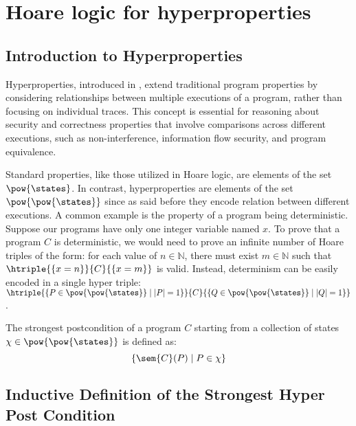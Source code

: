 \section{Hoare logic for hyperproperties}

\subsection{Introduction to Hyperproperties}
\label{chp:hyper}

Hyperproperties, introduced in \cite{Clarkson08}, extend traditional program 
properties by considering relationships between multiple executions of a 
program, rather than focusing on individual traces. This concept is essential 
for reasoning about security and correctness properties that involve comparisons 
across different executions, such as non-interference, information flow security, 
and program equivalence.

Standard properties, like those utilized in Hoare logic, are elements of the set 
$\pow{\states}$. In contrast, hyperproperties are elements of the set 
$\pow{\pow{\states}}$ since as said before they encode relation between different
executions. A common example is the property of a program being deterministic. 
Suppose our programs have only one integer variable named \(x\). 
To prove that a program \(C\) is deterministic, we would need to prove an 
infinite number of Hoare triples of the form: for each value of 
\(n \in \mathbb{N}\), there must exist \(m \in \mathbb{N}\) such that 
$\htriple{\{ x = n \}}{C}{\{ x = m \}}$ is valid. Instead, determinism can be 
easily encoded in a single hyper triple: $\htriple{\{ P \in \pow{\pow{\states}} 
\mid |P| = 1 \}}{C}{\{Q \in \pow{\pow{\states}} \mid |Q| = 1\}}$.

\begin{definition}
  The strongest postcondition of a program \(C\) starting from a collection of 
  states \(\chi \in \pow{\pow{\states}}\) is defined as:
  $$\{ \sem{C}(P) \mid P \in \chi \}$$
\end{definition}


\subsection{Inductive Definition of the Strongest Hyper Post Condition}

